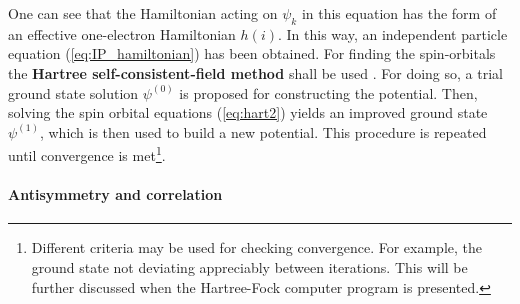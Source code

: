 One can see that the Hamiltonian acting on $\psi_k$ in this equation has the form of an effective one-electron Hamiltonian $h(i)$. In this way, an independent particle equation (\ref{eq:IP_hamiltonian}) has been obtained. %
For finding the spin-orbitals the \textbf{Hartree self-consistent-field method} shall be used \cite{Blinder}. For doing so, a trial ground state solution $\psi^{(0)}$ is proposed for constructing the potential. Then, solving the spin orbital equations (\ref{eq:hart2}) yields an improved ground state $\psi^{(1)}$, which is then used to build a new potential. This procedure is repeated until convergence is met\footnote{Different criteria may be used for checking convergence. For example, the ground state not deviating appreciably between iterations. This will be further discussed when the Hartree-Fock computer program is presented.}.

\paragraph{Antisymmetry and correlation} %

